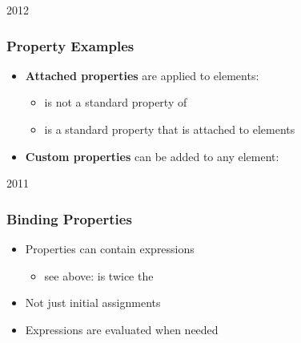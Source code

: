
\begin{slide}{2012}\frametitle{Property Examples}

\begin{itemize}
\item \textbf{Attached properties} are applied to elements:

\vspace*{0.25em}

\begin{itemize}
\item {} is not a standard property of 
\item is a standard property that is attached to elements
\end{itemize}

\vspace*{0.5em}
\item \textbf{Custom properties} can be added to any element:

\vspace*{0.25em}
\end{itemize}

\end{slide}



\begin{slide}{2011}\frametitle{Binding Properties}



\begin{itemize}
\item Properties can contain expressions
  \begin{itemize}
  \item see above:  is twice the 
  \end{itemize}
\item Not just initial assignments
\item Expressions are evaluated when needed
\end{itemize}

\end{slide}


